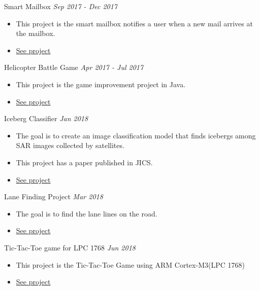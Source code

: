 \documentclass[10pt]{article}
\newenvironment{changemargin}[2]{
  \begin{list}{}{
    \setlength{\topsep}{0pt}
    \setlength{\leftmargin}{#1}
    \setlength{\rightmargin}{#2}
    \setlength{\listparindent}{\parindent}
    \setlength{\itemindent}{\parindent}
    \setlength{\parsep}{\parskip}
  }
  \item[]}{\end{list}
}
\newcommand{\project}[2]{
	{#1} \hfill \emph{#2}\\ \medskip
}
\newenvironment{body} {
	\vspace*{-16pt}
	\begin{changemargin}{-0.25in}{-0.5in}
  }
	{\end{changemargin}
}
\begin{document}
\begin{body}
	\vspace{14pt}

\project{Smart Mailbox}{Sep 2017 - Dec 2017}
\begin{itemize} \itemsep -0pt  %
      \item  This project is the smart mailbox notifies a user when a new mail arrives at the mailbox.
      \item \href{https://github.com/jeongwhanchoi/Smart-Mailbox}{See project}
  	\end{itemize}
	
\project{Helicopter Battle Game}{Apr 2017 - Jul 2017}
\begin{itemize} \itemsep -0pt  %
      \item  This project is the game improvement project in Java.
      \item \href{https://github.com/jeongwhanchoi/helicopter_battle}{See project}
  	\end{itemize}

\project{Iceberg Classifier}{Jan 2018}
\begin{itemize} \itemsep -0pt  %
      \item  The goal is to create an image classification model that finds icebergs among SAR images collected by satellites.
      \item This project has a paper published in JICS.
      \item \href{https://github.com/jeongwhanchoi/MLND-Capstone-Project}{See project}
  	\end{itemize}

\project{Lane Finding Project}{Mar 2018}
\begin{itemize} \itemsep -0pt  %
      \item  The goal is to find the lane lines on the road.
      \item \href{https://github.com/jeongwhanchoi/CarND-LaneLines}{See project}
  	\end{itemize}

\project{Tic-Tac-Toe game for LPC 1768}{Jun 2018}
\begin{itemize} \itemsep -0pt  %
      \item  This project is the Tic-Tac-Toe Game using ARM Cortex-M3(LPC 1768)
      \item \href{https://github.com/jeongwhanchoi/tic-tac-toe-lpc1768}{See project}
  	\end{itemize}
	

\end{body}
\end{document}
